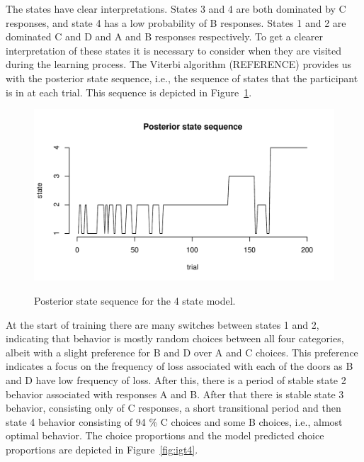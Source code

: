 \documentclass[a4paper,12pt,man,english]{apa} %
\begin{document}
The states have clear interpretations. States 3 and 4 are both
dominated by C responses, and state 4 has a low probability of B
responses. States 1 and 2 are dominated C and D and A and B responses 
respectively. To get a clearer interpretation of these states it is
necessary to consider when they are visited during the learning
process. The Viterbi algorithm (REFERENCE) provides us with the
posterior state sequence, i.e., the sequence of states that the
participant is in at each trial. This sequence is depicted in
Figure~\ref{fig:post4}. 

\begin{figure}
\begin{center}
	\includegraphics[width=\textwidth]{graphs/post4.pdf}
	\label{fig:post4}
	\caption{Posterior state sequence for the 4 state model.}
\end{center}
\end{figure}

At the start of training there are many switches between states 1 and 
2, indicating that behavior is mostly random choices between all four 
categories, albeit with a slight preference for B and D over A and C
choices. This preference indicates a focus on the frequency of loss
associated with each of the doors as B and D have low frequency of
loss. After this, there is a period of stable state 2 behavior
associated with responses A and B. After that there is stable state 3 
behavior, consisting only of C responses, a short transitional period 
and then state 4 behavior consisting of 94 \% C choices and some B
choices, i.e., almost optimal behavior. The choice proportions and the
model predicted choice proportions are depicted in
Figure~\ref{fig:igt4}. 
\end{document}
